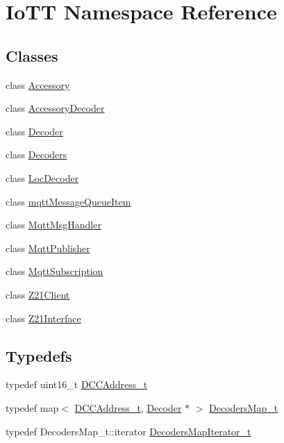 \hypertarget{namespaceIoTT}{}\section{Io\+TT Namespace Reference}
\label{namespaceIoTT}
\subsection*{Classes}
\begin{DoxyCompactItemize}
\item 
class \hyperlink{classIoTT_1_1Accessory}{Accessory}
\item 
class \hyperlink{classIoTT_1_1AccessoryDecoder}{Accessory\+Decoder}
\item 
class \hyperlink{classIoTT_1_1Decoder}{Decoder}
\item 
class \hyperlink{classIoTT_1_1Decoders}{Decoders}
\item 
class \hyperlink{classIoTT_1_1LocDecoder}{Loc\+Decoder}
\item 
class \hyperlink{classIoTT_1_1mqttMessageQueueItem}{mqtt\+Message\+Queue\+Item}
\item 
class \hyperlink{classIoTT_1_1MqttMsgHandler}{Mqtt\+Msg\+Handler}
\item 
class \hyperlink{classIoTT_1_1MqttPublisher}{Mqtt\+Publisher}
\item 
class \hyperlink{classIoTT_1_1MqttSubscription}{Mqtt\+Subscription}
\item 
class \hyperlink{classIoTT_1_1Z21Client}{Z21\+Client}
\item 
class \hyperlink{classIoTT_1_1Z21Interface}{Z21\+Interface}
\end{DoxyCompactItemize}
\subsection*{Typedefs}
\begin{DoxyCompactItemize}
\item 
typedef uint16\+\_\+t \hyperlink{namespaceIoTT_a31b8cd9473fc447b3fb341b78afa54fe}{D\+C\+C\+Address\+\_\+t}
\item 
typedef map$<$ \hyperlink{namespaceIoTT_a31b8cd9473fc447b3fb341b78afa54fe}{D\+C\+C\+Address\+\_\+t}, \hyperlink{classIoTT_1_1Decoder}{Decoder} $\ast$ $>$ \hyperlink{namespaceIoTT_a677ecaa41dfd1a0a7987bda3d12720f4}{Decoders\+Map\+\_\+t}
\item 
typedef Decoders\+Map\+\_\+t\+::iterator \hyperlink{namespaceIoTT_aa58ce75b7106007510f71144195e192c}{Decoders\+Map\+Iterator\+\_\+t}
\end{DoxyCompactItemize}
